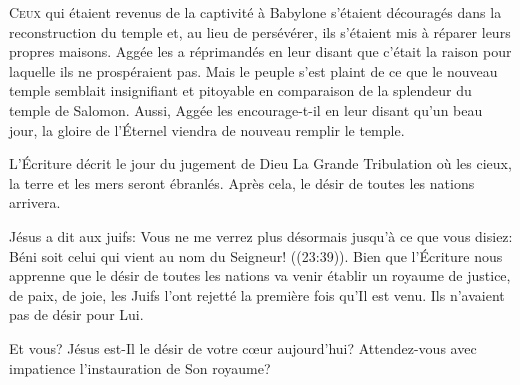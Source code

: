 


\lettrine{C}{eux} qui étaient revenus de la captivité à Babylone
 s'étaient découragés dans la reconstruction du temple et,
 au lieu de persévérer, ils s'étaient mis à réparer leurs propres maisons.
 Aggée les a réprimandés en leur disant que c'était la raison
 pour laquelle ils ne prospéraient pas. Mais le peuple s'est plaint
 de ce que le nouveau temple semblait insignifiant et pitoyable
 en comparaison de la splendeur du temple de Salomon.
 Aussi, Aggée les encourage-t-il en leur disant qu'un beau jour,
 la gloire de l'Éternel viendra de nouveau remplir le temple. 


L'Écriture décrit le jour du jugement de Dieu
 \ocadr La Grande Tribulation \fcadr{} où les cieux,
 la terre et les mers seront ébranlés. Après cela,
 le \Og désir de toutes les nations \Fg{} arrivera. 

Jésus a dit aux juifs: 
 \Og Vous ne me verrez plus désormais jusqu'à ce que vous disiez:
 Béni soit celui qui vient au nom du Seigneur! \Fg{} ((23:39)).
 Bien que l'Écriture nous apprenne que \Og le désir de toutes les nations \Fg{}
 va venir établir un royaume de justice, de paix, de joie, les Juifs
 l'ont rejetté la première fois qu'Il est venu.
 Ils n'avaient pas de désir pour Lui. 

Et vous? Jésus est-Il le désir de votre c\oe{}ur aujourd'hui?
 Attendez-vous avec impatience l'instauration de Son royaume? 

\dvrule



